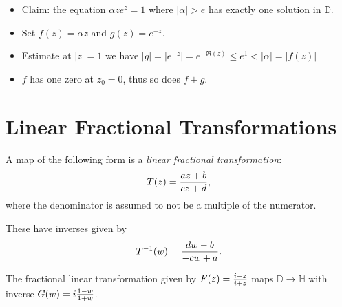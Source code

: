 \begin{example}

\begin{itemize}
\tightlist
\item
  Claim: the equation \(\alpha z e^z = 1\) where
  \({\left\lvert {\alpha} \right\rvert} > e\) has exactly one solution
  in \({\mathbb{D}}\).
\item
  Set \(f(z) = \alpha z\) and \(g(z) = e^{-z}\).
\item
  Estimate at \({\left\lvert {z} \right\rvert} =1\) we have
  \({\left\lvert {g} \right\rvert} ={\left\lvert {e^{-z}} \right\rvert} = e^{-\Re(z)} \leq e^1 < {\left\lvert {\alpha} \right\rvert} = {\left\lvert {f(z)} \right\rvert}\)
\item
  \(f\) has one zero at \(z_0 = 0\), thus so does \(f+g\).
\end{itemize}

\end{example}

\hypertarget{linear-fractional-transformations}{%
\section{Linear Fractional
Transformations}\label{linear-fractional-transformations}}

\begin{definition}

A map of the following form is a \emph{linear fractional
transformation}:
\begin{align*}  
T(z) = {az + b \over cz + d}
,\end{align*}
where the denominator is assumed to not be a multiple of the numerator.

These have inverses given by
\begin{align*}  
T^{-1}(w) = {dw-b \over -cw + a}
.\end{align*}

\end{definition}

\begin{theorem}

The fractional linear transformation given by
\(F(z) = {i - z \over i + z}\) maps \({\mathbb{D}}\to {\mathbb{H}}\)
with inverse \(G(w) = i {1-w \over 1 + w}\).

\end{theorem}

